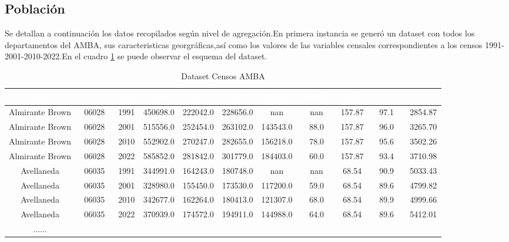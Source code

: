 \documentclass{article}
\theoremstyle{mytheoremstyle}
\theoremstyle{mytheoremstyle}
\theoremstyle{myproblemstyle}
\begin{document}
\subsection{Población}
Se detallan a continuación los datos recopilados 
según nivel de agregación.En primera instancia se  generó un dataset con todos los departamentos del AMBA,
 sus caracteristicas georgráficas,así como los valores
de las variables censales correspondientes a los censos 1991-2001-2010-2022.En el cuadro \ref{tab:censos_amba} 
se puede observar el esquema del dataset.
\begin{table}[htb]
  \centering
  \footnotesize
  \begin{tabular}{|c|c|c|c|c|c|c|c|c|c|c|}
  \hline
    \textbf{\cellcolor[rgb]{0,0.231,0.427}\textcolor{white}{nam}} &
   \textbf{\cellcolor[rgb]{0,0.231,0.427}\textcolor{white}{$cod_depto$}} 
   & \textbf{\cellcolor[rgb]{0,0.231,0.427}\textcolor{white}{anio}} &
   \textbf{\cellcolor[rgb]{0,0.231,0.427}\textcolor{white}{pob}} & 
   \textbf{\cellcolor[rgb]{0,0.231,0.427}\textcolor{white}{var}} & 
   \textbf{\cellcolor[rgb]{0,0.231,0.427}\textcolor{white}{muj}} &
    \textbf{\cellcolor[rgb]{0,0.231,0.427}\textcolor{white}{vivpart}} & 
    \textbf{\cellcolor[rgb]{0,0.231,0.427}\textcolor{white}{vivtotal}} &
     \textbf{\cellcolor[rgb]{0,0.231,0.427}\textcolor{white}{sup}} &
      \textbf{\cellcolor[rgb]{0,0.231,0.427}\textcolor{white}{$ind_masc$}} &
       \textbf{\cellcolor[rgb]{0,0.231,0.427}\textcolor{white}{$dens_pob$}} \\
  \hline
  Almirante Brown & 06028 & 1991 & 450698.0 & 222042.0 & 228656.0 & nan & nan & 157.87 & 97.1 & 2854.87 \\
  Almirante Brown & 06028 & 2001 & 515556.0 & 252454.0 & 263102.0 & 143543.0 & 88.0 & 157.87 & 96.0 & 3265.70 \\
  Almirante Brown & 06028 & 2010 & 552902.0 & 270247.0 & 282655.0 & 156218.0 & 78.0 & 157.87 & 95.6 & 3502.26 \\
   Almirante Brown & 06028 & 2022 & 585852.0 & 281842.0 & 301779.0 & 184403.0 & 60.0 & 157.87 & 93.4 & 3710.98 \\
    Avellaneda & 06035 & 1991 & 344991.0 & 164243.0 & 180748.0 & nan & nan & 68.54 & 90.9 & 5033.43 \\
  Avellaneda & 06035 & 2001 & 328980.0 & 155450.0 & 173530.0 & 117200.0 & 59.0 & 68.54 & 89.6 & 4799.82 \\
  Avellaneda & 06035 & 2010 & 342677.0 & 162264.0 & 180413.0 & 121307.0 & 68.0 & 68.54 & 89.9 & 4999.66 \\
  Avellaneda & 06035 & 2022 & 370939.0 & 174572.0 & 194911.0 & 144988.0 & 64.0 & 68.54 & 89.6 & 5412.01 \\
  ...... &  &  &  &  &  & &  &  &  &  \\ \hline
  \end{tabular}
  \caption{Dataset Censos AMBA}
  \label{tab:censos_amba}
  \end{table}
  
\end{document}
